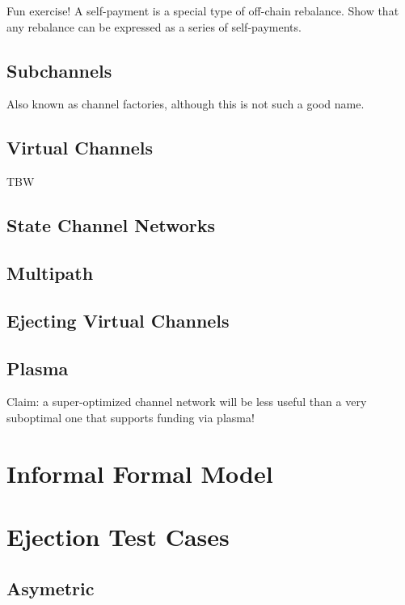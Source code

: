 \documentclass{article}
\begin{document}
Fun exercise! A self-payment is a special type of off-chain rebalance. Show that any rebalance can be expressed as a series of self-payments.

\subsection*{Subchannels}

Also known as channel factories, although this is not such a good name.

\subsection*{Virtual Channels}

TBW

\subsection*{State Channel Networks}

\subsection*{Multipath}

\subsection*{Ejecting Virtual Channels}

\subsection*{Plasma}

Claim: a super-optimized channel network will be less useful than a very suboptimal one that supports funding via plasma!

\section*{Informal Formal Model}

\section*{Ejection Test Cases}

\subsection*{Asymetric}
\end{document}
